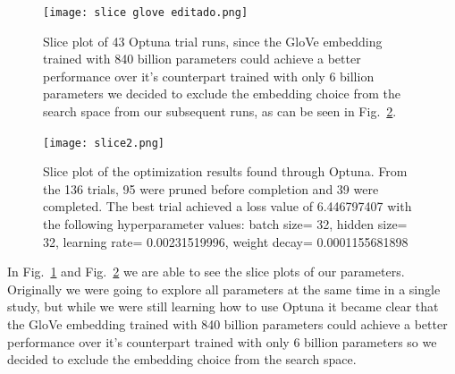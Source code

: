 \begin{figure}[!ht]
\centerline{\texttt{[image: slice glove editado.png]}   }
 \caption{Slice plot of 43 Optuna trial runs, since the GloVe embedding trained with 840 billion parameters could achieve a better performance over it's counterpart trained with only 6 billion parameters we decided to exclude the embedding choice from the search space from our subsequent runs, as can be seen in Fig.~\ref{slice}.}
\label{sliceglove}
\end{figure}



\begin{figure}[!ht]
\centerline{\texttt{[image: slice2.png]}   }
\caption{Slice plot of the optimization results found through Optuna. From the 136 trials, 95 were pruned before completion and 39 were completed. The best trial achieved a loss value of 6.446797407 with the following hyperparameter values:
    batch size= 32,
    hidden size= 32,    learning rate= 0.00231519996,
    weight decay= 0.0001155681898}
\label{slice}
\end{figure}


In Fig.~\ref{sliceglove} and Fig.~\ref{slice} we are able to see the slice plots of our parameters. Originally we were going to explore all parameters at the same time in a single study, but while we were still learning how to use Optuna it became clear that the GloVe embedding trained with 840 billion parameters could achieve a better performance over it's counterpart trained with only 6 billion parameters so we decided to exclude the embedding choice from the search space.









